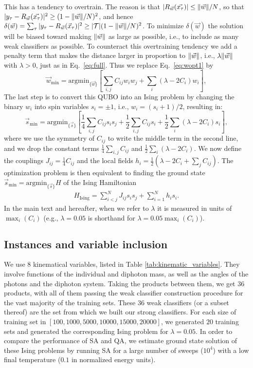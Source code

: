 \documentclass[fleqn,10pt]{wlscirep}
\newcommand{\beq}{\begin{equation}}
\newcommand{\eeq}{\end{equation}}
\newcommand{\mc}{\mathcal}
\begin{document}
This has a tendency to overtrain. The reason is that $|R_{\vec{w}}(\vec{x_\tau})| \leq {\norm{\vec{w}}}/{N}$, so that $|y_\tau-R_{\vec{w}}(\vec{x_\tau})|^2 \geq (1-\norm{\vec{w}}/{N})^2$, and hence $\delta(\vec{w}) = \sum_\tau |y_\tau-R_{\vec{w}}(\vec{x}_\tau)|^2 \geq |\mc{T}| (1-{\norm{\vec{w}}}/{N})^2$. To minimize $\delta(\vec{w})$ the solution will be biased toward making $\norm{\vec{w}}$ as large as possible, i.e., to include as many weak classifiers as possible. To counteract this overtraining tendency we add a penalty term that makes the distance larger in proportion to $\norm{\vec{w}}$, i.e., $\lambda\norm{\vec{w}}$ with $\lambda>0$, just as in Eq.~\eqref{eq:full}. Thus we replace Eq.~\eqref{eq:wopt1} by
\beq
\vec{w}_{\min}  = \mathrm{argmin}_{\{\vec{w}\}} \left[ \sum_{i,j} C_{ij} w_i w_j + \sum_i (\lambda-2C_i) w_i \right] ,
\label{eq:wopt2}
\eeq
The last step is to convert this QUBO into an Ising problem by changing the binary $w_i$ into spin variables $s_i=\pm 1$, i.e., $w_i= (s_i+1)/2$, resulting in:
\beq
\vec{s}_{\min}  = \mathrm{argmin}_{\{\vec{s}\}} \left[ \frac{1}{4}\sum_{i,j} C_{ij} s_i s_j +\frac{1}{2}\sum_{i,j}C_{ij}s_i + \frac{1}{2}\sum_i (\lambda-2C_i) s_i \right] ,
\eeq
where we use the symmetry of $C_{ij}$ to write the middle term in the second line, and we drop the constant terms $\frac{1}{4}\sum_{i,j} C_{ij}$ and $\frac{1}{2}\sum_i (\lambda-2C_i)$.
We now define the couplings $J_{ij} = \frac{1}{4} C_{ij}$ and the local fields $h_i=\frac{1}{2}\left(\lambda-2C_i+\sum_{j}C_{ij} \right)$. The optimization problem is then equivalent to finding the ground state 
$\vec{s}_{\min} = \mathrm{argmin}_{\{\vec{s}\}} H$ of the Ising Hamiltonian
 \begin{align}
 		H_{\mathrm{Ising}} =  \sum_{i<j}^{N} J_{ij} s_i s_j + \sum_{i=1}^{N} h_i s_i .
		\label{eq:HIsing}
 \end{align}
In the main text and hereafter, when we refer to $\lambda$ it is measured in units of $\max_i(C_i)$ (e.g., $\lambda=0.05$ is shorthand for $\lambda=0.05\max_i(C_i)$).
 

\subsection*{Instances and variable inclusion}
We use $8$ kinematical variables, listed in Table \ref{tab:kinematic_variables}. They involve functions of the individual and diphoton mass, as well as the angles of the photons and the diphoton system. Taking the products between them, we get $36$ products, with all of them passing the weak classifier construction procedure for the vast majority of the training sets. These $36$ weak classifiers (or a subset thereof) are the set from which we built our strong classifiers.  For each size of training set in $[100,1000,5000,10000,15000,20000]$, we generated $20$ training sets and generated the corresponding Ising problem for $\lambda=0.05$. In order to compare the performance of SA and QA, we estimate ground state solution of these Ising problems by running SA for a large number of sweeps ($10^4$) with a low final temperature ($0.1$ in normalized energy units).
\end{document}
